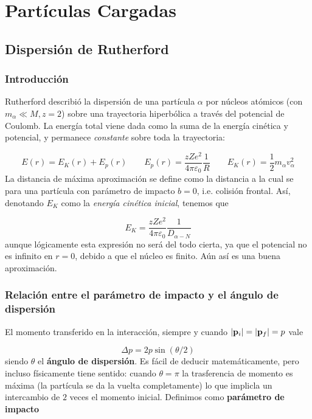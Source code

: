 \chapter{Partículas Cargadas}

\section{Dispersión de Rutherford}

\subsection{Introducción}

Rutherford describió la dispersión de una partícula $\alpha$ por núcleos atómicos (con $m_\alpha \ll M, z=2$) sobre una trayectoria hiperbólica a través del potencial de Coulomb. La energía total viene dada como la suma de la energía cinética y potencial, y permanece \textit{constante} sobre toda la trayectoria:

\begin{equation}
    E(r) = E_K(r) + E_p (r) \qquad  E_p (r) = \frac{ z Z e^2}{4\pi \varepsilon_0} \frac{1}{R} \qquad E_K (r) = \frac{1}{2} m_\alpha v_\alpha^2
\end{equation}
La distancia de máxima aproximación se define como la distancia a la cual se para una partícula con parámetro de impacto $b=0$, i.e. colisión frontal. Así, denotando $E_K$ como la \textit{energía cinética inicial}, tenemos que

\begin{equation}
   E_K = \frac{zZe^2}{4\pi\varepsilon_0} \frac{1}{D_{\alpha-N}}
\end{equation}
aunque lógicamente esta expresión no será del todo cierta, ya que el potencial no es infinito en $r=0$, debido a que el núcleo es finito. Aún así es una buena aproximación.


\subsection{Relación entre el parámetro de impacto y el ángulo de dispersión}

El momento transferido en la interacción, siempre y cuando $|\mathbf{p}_i |= |\mathbf{p}_f|=p$ vale 

\begin{equation}
    \Delta p = 2 p \sin (\theta/2)
\end{equation}
siendo $\theta$ el \textbf{ángulo de dispersión}. Es fácil de deducir matemáticamente, pero incluso físicamente tiene sentido: cuando $\theta=\pi$ la trasferencia de momento es máxima (la partícula se da la vuelta completamente) lo que implicla un intercambio de $2$ veces el momento inicial. Definimos como \textbf{parámetro de impacto} 

